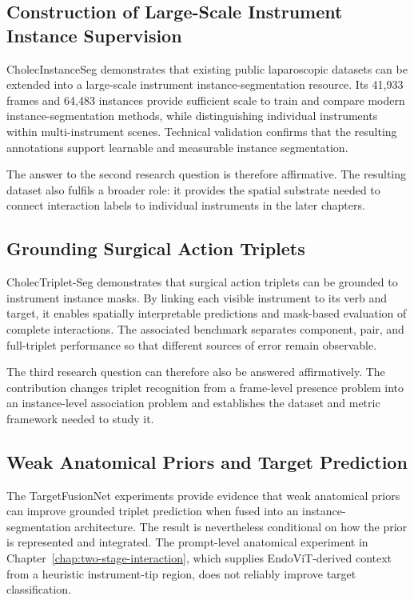 \subsection{Construction of Large-Scale Instrument Instance Supervision}
\label{sec:discussion-rq2}

CholecInstanceSeg demonstrates that existing public laparoscopic datasets can be extended into a large-scale instrument instance-segmentation resource. Its 41,933 frames and 64,483 instances provide sufficient scale to train and compare modern instance-segmentation methods, while distinguishing individual instruments within multi-instrument scenes. Technical validation confirms that the resulting annotations support learnable and measurable instance segmentation.

The answer to the second research question is therefore affirmative. The resulting dataset also fulfils a broader role: it provides the spatial substrate needed to connect interaction labels to individual instruments in the later chapters.

\subsection{Grounding Surgical Action Triplets}
\label{sec:discussion-rq3}

CholecTriplet-Seg demonstrates that surgical action triplets can be grounded to instrument instance masks. By linking each visible instrument to its verb and target, it enables spatially interpretable predictions and mask-based evaluation of complete interactions. The associated benchmark separates component, pair, and full-triplet performance so that different sources of error remain observable.

The third research question can therefore also be answered affirmatively. The contribution changes triplet recognition from a frame-level presence problem into an instance-level association problem and establishes the dataset and metric framework needed to study it.

\subsection{Weak Anatomical Priors and Target Prediction}
\label{sec:discussion-rq4}

The TargetFusionNet experiments provide evidence that weak anatomical priors can improve grounded triplet prediction when fused into an instance-segmentation architecture. The result is nevertheless conditional on how the prior is represented and integrated. The prompt-level anatomical experiment in Chapter~\ref{chap:two-stage-interaction}, which supplies EndoViT-derived context from a heuristic instrument-tip region, does not reliably improve target classification.

